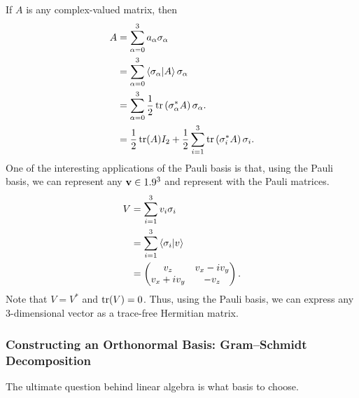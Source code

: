 \documentclass[10pt]{mypackage}
\begin{document}
\begin{example}
If $A$ is any complex-valued matrix, then
\begin{align*}
  A &= \sum_{\alpha=0}^{3}a_{\alpha}\sigma_{\alpha}\\
    &= \sum_{\alpha=0}^{3}\braket{\sigma_{\alpha}}{A}\sigma_{\alpha}\\
    &= \sum_{\alpha = 0}^{3}\frac{1}{2}\tr\left(\sigma_{\alpha}^{\ast}A\right)\sigma_{\alpha}.\\
    &= \frac{1}{2}\tr(A) I_{2} + \frac{1}{2}\sum_{i=1}^{3}\tr\left(\sigma_{i}^{\ast}A\right)\sigma_{i}.
\end{align*}
One of the interesting applications of the Pauli basis is that, using the Pauli basis, we can represent any $\mathbf{v}\in 1.9^{3}$ and represent with the Pauli matrices.
\begin{align*}
  V &= \sum_{i=1}^{3}v_{i}\sigma_{i}\\
    &= \sum_{i=1}^{3}\braket{\sigma_{i}}{v}\\
    &= \begin{pmatrix}v_z & v_x - iv_y\\v_x + iv_y & -v_z \end{pmatrix}.
\end{align*}
Note that $V = V^{\ast}$ and $\tr(V) = 0$. Thus, using the Pauli basis, we can express any $3$-dimensional vector as a trace-free Hermitian matrix.
\end{example}
\subsubsection{Constructing an Orthonormal Basis: Gram--Schmidt Decomposition}%
The ultimate question behind linear algebra is what basis to choose.\newline
\end{document}
